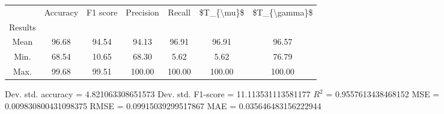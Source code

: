 \begin{tabular}{|c|c|c|c|c|c|c|}
\toprule
{} &  Accuracy &  F1 score &  Precision &  Recall &  \$T\_\{\textbackslash mu\}\$ &  \$T\_\{\textbackslash gamma\}\$ \\
Results &           &           &            &         &            &               \\
\hline
Mean    &     96.68 &     94.54 &      94.13 &   96.91 &      96.91 &         96.57 \\
Min.    &     68.54 &     10.65 &      68.30 &    5.62 &       5.62 &         76.79 \\
Max.    &     99.68 &     99.51 &     100.00 &  100.00 &     100.00 &        100.00 \\
\bottomrule
\end{tabular}

 Dev. std. accuracy = 4.821063308651573
 Dev. std. F1-score = 11.113531113581177
 $R^2$ = 0.9557613438468152
 MSE = 0.009830800431098375
 RMSE = 0.09915039299517867
 MAE = 0.035646483156222944